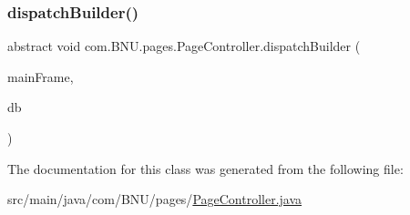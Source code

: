 \subsubsection{\texorpdfstring{dispatch\+Builder()}{dispatchBuilder()}}
{\footnotesize\ttfamily abstract void com.\+B\+N\+U.\+pages.\+Page\+Controller.\+dispatch\+Builder (\begin{DoxyParamCaption}\item[{J\+Frame}]{main\+Frame,  }\item[{\mbox{\hyperlink{interfacecom_1_1_b_n_u_1_1database_1_1db_wrapper}{db\+Wrapper}}}]{db }\end{DoxyParamCaption})\hspace{0.3cm}{\ttfamily [abstract]}}



The documentation for this class was generated from the following file\+:\begin{DoxyCompactItemize}
\item 
src/main/java/com/\+B\+N\+U/pages/\mbox{\hyperlink{_page_controller_8java}{Page\+Controller.\+java}}\end{DoxyCompactItemize}
